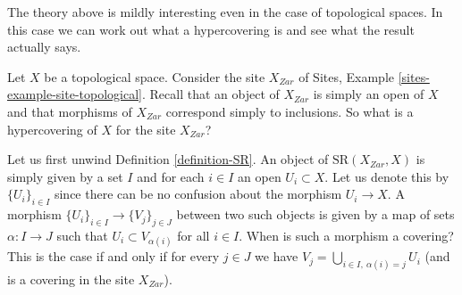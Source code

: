\noindent
The theory above is mildly interesting even in the case of topological
spaces. In this case we can work out what a hypercovering is and see
what the result actually says.

\medskip\noindent
Let $X$ be a topological space. Consider the site $X_{Zar}$
of Sites, Example \ref{sites-example-site-topological}. Recall that
an object of $X_{Zar}$ is simply an open of $X$ and that morphisms
of $X_{Zar}$ correspond simply to inclusions. So what is a
hypercovering of $X$ for the site $X_{Zar}$?

\medskip\noindent
Let us first unwind Definition \ref{definition-SR}.
An object of $\text{SR}(X_{Zar}, X)$ is simply given by a set
$I$ and for each $i \in I$ an open $U_i \subset X$.
Let us denote this by $\{U_i\}_{i \in I}$ since there can be no
confusion about the morphism $U_i \to X$.
A morphism $\{U_i\}_{i \in I} \to \{V_j\}_{j \in J}$
between two such objects is given by a map of sets
$\alpha : I \to J$ such that $U_i \subset V_{\alpha(i)}$ for all
$i \in I$. When is such a morphism a covering? This is the case
if and only if for every $j \in J$ we have
$V_j = \bigcup_{i\in I, \ \alpha(i) = j} U_i$ (and is
a covering in the site $X_{Zar}$).

